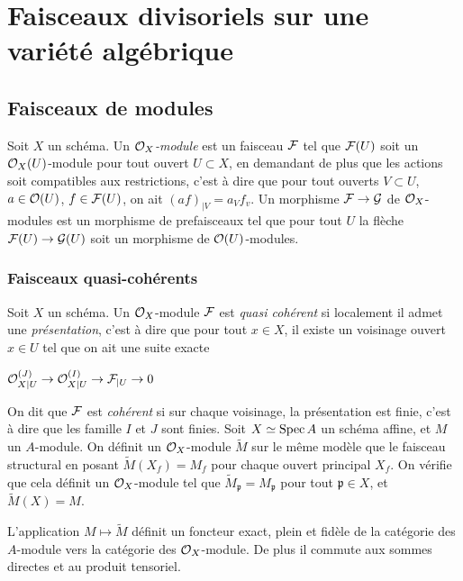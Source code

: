 \chapter{Faisceaux divisoriels sur une variété algébrique}


\section{Faisceaux de modules}

Soit $X$ un schéma. Un \textit{$\mathcal{O}_X$-module} est un faisceau $\mathcal{F}$ tel que $\mathcal{F}(U)$ soit un $\mathcal{O}_X(U)$-module pour tout ouvert $U\subset X$, en demandant de plus que les actions soit compatibles aux restrictions, c'est à dire que pour tout ouverts $V\subset U$, $a\in\mathcal{O}(U)$, $f\in \mathcal{F}(U)$, on ait $(af)_{|V}=a_Vf_v$. Un morphisme $\mathcal{F}\rightarrow\mathcal{G}$ de $\mathcal{O}_X$-modules est un morphisme de prefaisceaux tel que pour tout $U$ la flèche $\mathcal{F}(U)\rightarrow\mathcal{G}(U)$ soit un morphisme de $\mathcal{O}(U)$-modules. 

\subsection{Faisceaux quasi-cohérents}

Soit $X$ un schéma. Un $\mathcal{O}_X$-module $\mathcal{F}$ est \textit{quasi cohérent} si localement il admet une \textit{présentation}, c'est à dire que pour tout $x\in X$, il existe un voisinage ouvert $x\in U$ tel que on ait une suite exacte
\begin{center}
$\mathcal{O}_{X|U}^{(J)}\rightarrow\mathcal{O}_{X|U}^{(I)}\rightarrow \mathcal{F}_{|U}\rightarrow 0$
\end{center}

On dit que $\mathcal{F}$ est \textit{cohérent} si sur chaque voisinage, la présentation est finie, c'est à dire que les famille $I$ et $J$ sont finies.
Soit $X\simeq \operatorname{Spec} A$ un schéma affine, et $M$ un $A$-module. On définit un $\mathcal{O}_X$-module $\widetilde{M}$ sur le même modèle que le faisceau structural en posant $\widetilde{M}(X_f)=M_f$ pour chaque ouvert principal $X_f$. On vérifie que cela définit un $\mathcal{O}_X$-module tel que $\widetilde{M}_\mathfrak{p}=M_\mathfrak{p}$ pour tout $\mathfrak{p}\in X$, et $\widetilde{M}(X)=M$.


\begin{prop}
L'application $M\mapsto \widetilde{M}$ définit un foncteur exact, plein et fidèle de la catégorie des $A$-module vers la catégorie des $\mathcal{O}_X$-module. De plus il commute aux sommes directes et au produit tensoriel.
\end{prop}


